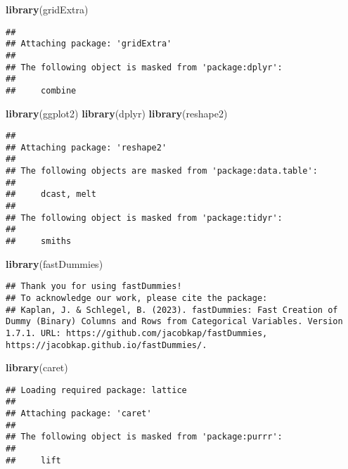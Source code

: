 \documentclass[
]{article}
\newenvironment{Shaded}{\begin{snugshade}}{\end{snugshade}}
\newcommand{\FunctionTok}[1]{\textcolor[rgb]{0.13,0.29,0.53}{\textbf{#1}}}
\newcommand{\NormalTok}[1]{#1}
\newcommand{\StringTok}[1]{\textcolor[rgb]{0.31,0.60,0.02}{#1}}
\begin{document}
\begin{Shaded}
\begin{Highlighting}[]
\FunctionTok{library}\NormalTok{(gridExtra)}
\end{Highlighting}
\end{Shaded}

\begin{verbatim}
## 
## Attaching package: 'gridExtra'
## 
## The following object is masked from 'package:dplyr':
## 
##     combine
\end{verbatim}

\begin{Shaded}
\begin{Highlighting}[]
\FunctionTok{library}\NormalTok{(ggplot2)}
\FunctionTok{library}\NormalTok{(dplyr)}
\FunctionTok{library}\NormalTok{(reshape2)}
\end{Highlighting}
\end{Shaded}

\begin{verbatim}
## 
## Attaching package: 'reshape2'
## 
## The following objects are masked from 'package:data.table':
## 
##     dcast, melt
## 
## The following object is masked from 'package:tidyr':
## 
##     smiths
\end{verbatim}

\begin{Shaded}
\begin{Highlighting}[]
\FunctionTok{library}\NormalTok{(}\StringTok{\textquotesingle{}fastDummies\textquotesingle{}}\NormalTok{)}
\end{Highlighting}
\end{Shaded}

\begin{verbatim}
## Thank you for using fastDummies!
## To acknowledge our work, please cite the package:
## Kaplan, J. & Schlegel, B. (2023). fastDummies: Fast Creation of Dummy (Binary) Columns and Rows from Categorical Variables. Version 1.7.1. URL: https://github.com/jacobkap/fastDummies, https://jacobkap.github.io/fastDummies/.
\end{verbatim}

\begin{Shaded}
\begin{Highlighting}[]
\FunctionTok{library}\NormalTok{(caret)}
\end{Highlighting}
\end{Shaded}

\begin{verbatim}
## Loading required package: lattice
## 
## Attaching package: 'caret'
## 
## The following object is masked from 'package:purrr':
## 
##     lift
\end{verbatim}
\end{document}
